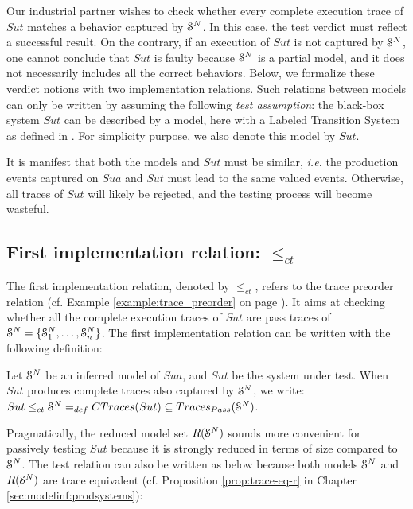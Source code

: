 Our industrial partner wishes to check whether every complete
execution trace of $\mathit{Sut}$ matches a behavior captured by
$\EuScript{S}^{N}$. In this case, the test verdict must reflect a
successful result. On the contrary, if an execution of
$\mathit{Sut}$ is not captured by $\EuScript{S}^{N}$, one cannot
conclude that $\mathit{Sut}$ is faulty because $\EuScript{S}^{N}$
is a partial model, and it does not necessarily includes all the
correct behaviors. Below, we formalize these verdict notions
with two implementation relations. Such relations between models
can only be written by assuming the following \emph{test
assumption}: the black-box system $\mathit{Sut}$ can be described
by a model, here with a Labeled Transition System as defined in
. For
simplicity purpose, we also denote this model by $\mathit{Sut}$.

It is manifest that both the models and $\mathit{Sut}$ must be
similar, \emph{i.e.} the production events captured on
$\mathit{Sua}$ and $\mathit{Sut}$ must lead to the same valued
events. Otherwise, all traces of $\mathit{Sut}$ will likely be
rejected, and the testing process will become wasteful.

\subsection{First implementation relation: $\leq_{ct}$}

The first implementation relation, denoted by $\leq_{ct}$, refers
to the trace preorder relation
\cite{DNH84,vaandrager1991relationship} (cf. Example
\ref{example:trace_preorder} on page
\pageref{example:trace_preorder}).
It aims at checking whether all the complete execution traces of
$\mathit{Sut}$ are pass traces of
$\EuScript{S}^{N}=\{\EuScript{S}_1^{N},\dots,\EuScript{S}_n^{N}\}$.
The first implementation relation can be written with the
following definition:

\begin{definition}
\label{rel:impl1}

Let $\EuScript{S}^{N}$ be an inferred model of $\mathit{Sua}$, and
$\mathit{Sut}$ be the system under test. When $\mathit{Sut}$
produces complete traces also captured by $\EuScript{S}^{N}$, we
write: ${Sut} \leq_{ct} \EuScript{S}^{N} =_{def} CTraces({Sut})
\subseteq  Traces_{Pass}(\EuScript{S}^{N})$.
\end{definition}

Pragmatically, the reduced model set $R(\EuScript{S}^{N})$ sounds
more convenient for passively testing $\mathit{Sut}$ because it
is strongly reduced in terms of size compared to
$\EuScript{S}^{N}$. The test relation can also be written
as below because both models $\EuScript{S}^{N}$ and
$R(\EuScript{S}^{N})$ are trace equivalent (cf. Proposition
\ref{prop:trace-eq-r} in Chapter \ref{sec:modelinf:prodsystems}):

